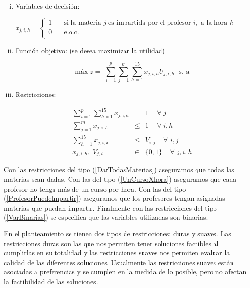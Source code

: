 \begin{enumerate}[i)]
\item Variables de decisión:
  
  $ x_{j,i,h} =
  \begin{cases}
1  & \quad \text{si la materia } j \text{ es impartida por el profesor  } i,\text{ a la hora } h\\
0  & \quad \text{e.o.c. } \\
\end{cases}
$
  
  \item Función objetivo: (se desea maximizar la utilidad)

\begin{equation*}
\text{máx} \,\, z =  \,\, \displaystyle \sum_{i=1}^{p} \sum_{j=1}^{m} \sum_{h=1}^{15} x_{j,i,h} U_{j,i,h} \,\,\,\, \text{s. a}
\end{equation*}

\item Restricciones:
  
  \begin{eqnarray}
\displaystyle \sum_{i=1}^{p} \sum_{h=1}^{15} x_{j,i,h} &=& 1  \,\,\,\,\,\,\, \forall \,\, j\label{DarTodasMaterias}\\
\displaystyle \sum_{j=1}^{m} x_{j,i,h} &\leqslant& 1 \,\,\,\,\,\,\, \forall \,\, i,h \label{UnCursoXhora}\\
\displaystyle \sum_{h=1}^{15} x_{j,i,h} &\leqslant& V_{i,j} \,\,\,\,\,\,\, \forall \,\, i,j \label{ProfesorPuedeImpartir}\\
x_{j,i,h}, \,\, V_{j,i} &\in& \{0,1\} \,\,\,\,\,\,\, \forall \,\, j,i,h \label{VarBinarias}
\end{eqnarray}
\end{enumerate}

Con las restricciones del tipo (\ref{DarTodasMaterias}) aseguramos que todas las materias sean dadas. Con las del tipo (\ref{UnCursoXhora}) aseguramos que cada profesor no tenga más de un curso por hora. Con las del tipo (\ref{ProfesorPuedeImpartir}) aseguramos que los profesores tengan asignadas materias que puedan impartir. Finalmente con las restricciones del tipo (\ref{VarBinarias}) se especifica que las variables utilizadas son binarias.

En el planteamiento se tienen dos tipos de restricciones: duras y suaves. Las restricciones duras son las que nos permiten tener soluciones factibles al cumplirlas en su totalidad y las restricciones suaves nos permiten evaluar la calidad de las diferentes soluciones. Usualmente las restricciones suaves están asociadas a preferencias y se cumplen en la medida de lo posible, pero no afectan la factibilidad de las soluciones.

